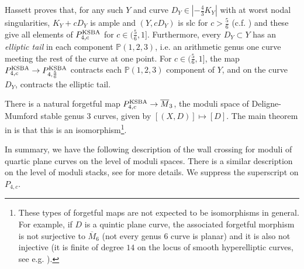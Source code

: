\documentclass[11pt]{amsart}
\numberwithin{equation}{section}
\theoremstyle{definition}
\newcommand{\KSBA}{{\rm KSBA}}
\newcommand{\bP}{\mathbb{P}}
\newcommand{\oM}{\overline M}
\begin{document}
Hassett proves that, for any such $Y$ and curve $D_Y \in |-\frac{4}{3}K_Y|$ with at worst nodal singularities, $K_Y + cD_Y$ is ample and $(Y,cD_Y)$ is slc for $c>\frac{5}{6}$ (c.f. \cite[Lemma 4.3]{hassett}) and these give all elements of $P^\KSBA_{4, c}$ for $c\in(\frac{5}{6},1]$.  Furthermore, every $D_Y \subset Y$ has an \textit{elliptic tail} in each component $\bP(1,2,3)$, i.e. an arithmetic genus one curve meeting the rest of the curve at one point.  For $c\in(\frac{5}{6},1]$, the map $P^\KSBA_{4, c} \to P^{\KSBA}_{4,\frac{5}{6}}$ contracts each $\bP(1,2,3)$ component of $Y$, and on the curve $D_Y$, contracts the elliptic tail. 

There is a natural forgetful map $P^{\KSBA}_{4,c} \to \overline{M}_3$, the moduli space of Deligne-Mumford stable genus 3 curves, given by $[(X,D)] \mapsto [D]$.  The main theorem in \cite{hassett} is that this is an isomorphism\footnote{These types of forgetful maps are not expected to be isomorphisms in general.  For example, if $D$ is a quintic plane curve, the associated forgetful morphism is not surjective to $\oM_6$ (not every genus 6 curve is planar) and it is also not injective (it is finite of degree $14$ on the locus of smooth hyperelliptic curves, see e.g. \cite[Corollary 7.8]{ADLpub}).}.  

In summary, we have the following description of the wall crossing for moduli of quartic plane curves on the level of moduli spaces.  There is a similar description on the level of moduli stacks, see \cite{ADLpub} for more details.  We suppress the superscript on $P_{4,c}$. 
\end{document}
